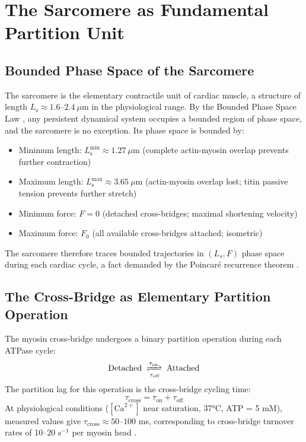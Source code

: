 \documentclass[10pt,twocolumn,a4paper]{article}
\theoremstyle{remark}
\newcommand{\taucross}{\tau_{\mathrm{cross}}}
\newcommand{\Ls}{L_{\mathrm{s}}}
\begin{document}
\section{The Sarcomere as Fundamental Partition Unit}
\label{sec:sarcomere}

\subsection{Bounded Phase Space of the Sarcomere}

The sarcomere is the elementary contractile unit of cardiac muscle, a structure of length $\Ls \approx 1.6$--$2.4~\mu\mathrm{m}$ in the physiological range. By the Bounded Phase Space Law \cite{sachikonye2024mass}, any persistent dynamical system occupies a bounded region of phase space, and the sarcomere is no exception. Its phase space is bounded by:
\begin{itemize}
    \item Minimum length: $\Ls^{\min} \approx 1.27~\mu\mathrm{m}$ (complete actin-myosin overlap prevents further contraction)
    \item Maximum length: $\Ls^{\max} \approx 3.65~\mu\mathrm{m}$ (actin-myosin overlap lost; titin passive tension prevents further stretch)
    \item Minimum force: $F = 0$ (detached cross-bridges; maximal shortening velocity)
    \item Maximum force: $F_0$ (all available cross-bridges attached; isometric)
\end{itemize}

The sarcomere therefore traces bounded trajectories in $(L_s, F)$ phase space during each cardiac cycle, a fact demanded by the Poincar\'{e} recurrence theorem \cite{poincare1890}.

\subsection{The Cross-Bridge as Elementary Partition Operation}

The myosin cross-bridge undergoes a binary partition operation during each ATPase cycle:
\begin{equation}
    \text{Detached} \;\xrightleftharpoons[\tau_{\mathrm{off}}]{\tau_{\mathrm{on}}}\; \text{Attached}
\end{equation}
The partition lag for this operation is the cross-bridge cycling time:
\begin{equation}
    \taucross = \tau_{\mathrm{on}} + \tau_{\mathrm{off}}
    \label{eq:tau_cross}
\end{equation}
At physiological conditions ($[\mathrm{Ca}^{2+}]$ near saturation, 37°C, ATP = 5 mM), measured values give $\taucross \approx 50$--$100$ ms, corresponding to cross-bridge turnover rates of 10--20 s$^{-1}$ per myosin head \cite{finer1994single,molloy1995movement}.
\end{document}
